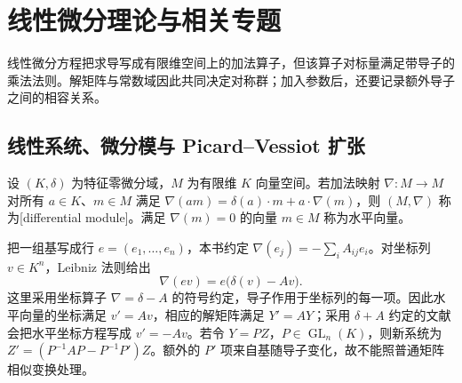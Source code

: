 
\section{线性微分理论与相关专题}
\label{b3:sec:E04}

线性微分方程把求导写成有限维空间上的加法算子，但该算子对标量满足带导子的乘法法则。解矩阵与常数域因此共同决定对称群；加入参数后，还要记录额外导子之间的相容关系。


\subsection{线性系统、微分模与 Picard–Vessiot 扩张}
\label{b3:subsec:E04:01}

\begin{definition}\label{b3:def:differential-module}
	设 \((K,\delta)\) 为特征零微分域，\(M\) 为有限维 \(K\) 向量空间。若加法映射 \(\nabla:M\to M\) 对所有 \(a\in K\)、\(m\in M\) 满足 \(\nabla(am)=\delta(a)\cdot m+a\cdot\nabla(m)\)，则 \((M,\nabla)\) 称为[differential module]。满足 \(\nabla(m)=0\) 的向量 \(m\in M\) 称为水平向量。
\end{definition}

把一组基写成行 \(e=(e_1,\ldots,e_n)\)，本书约定 \(\nabla(e_j)=-\sum_i A_{ij}e_i\)。对坐标列 \(v\in K^n\)，Leibniz 法则给出
\[
	\nabla(ev)=e\bigl(\delta(v)-Av\bigr).
\]
这里采用坐标算子 \(\nabla=\delta-A\) 的符号约定，导子作用于坐标列的每一项。因此水平向量的坐标满足 \(v'=Av\)，相应的解矩阵满足 \(Y'=AY\)；采用 \(\delta+A\) 约定的文献会把水平坐标方程写成 \(v'=-Av\)。若令 \(Y=PZ\)，\(P\in\operatorname{GL}_n(K)\)，则新系统为 \(Z'=(P^{-1}AP-P^{-1}P')Z\)。额外的 \(P'\) 项来自基随导子变化，故不能照普通矩阵相似变换处理。

